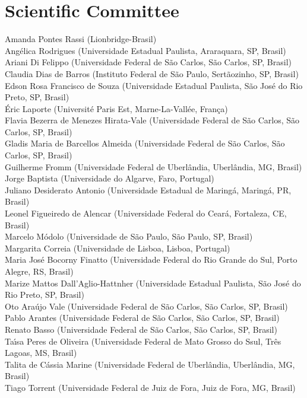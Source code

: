 \section*{Scientific Committee}
Amanda Pontes Rassi (Lionbridge-Brasil)\\
Ang\'elica Rodrigues (Universidade Estadual Paulista, Araraquara, SP, Brasil)\\
Ariani Di Felippo (Universidade Federal de S\~ao Carlos, S\~ao Carlos, SP, Brasil)\\
Claudia Dias de Barros (Instituto Federal de S\~ao Paulo,  Sert\~aozinho, SP, Brasil)\\
Edson Rosa Francisco de Souza (Universidade Estadual Paulista, S\~ao Jos\'e do Rio Preto, SP, Brasil)\\
\'Eric Laporte (Universit\'e Paris Est, Marne-La-Vall\'ee, Fran\c{c}a)\\
Flavia Bezerra de Menezes Hirata-Vale (Universidade Federal de S\~ao Carlos, S\~ao Carlos, SP, Brasil)\\
Gladis Maria de Barcellos Almeida (Universidade Federal de S\~ao Carlos, S\~ao Carlos, SP, Brasil)\\
Guilherme Fromm (Universidade Federal de Uberl\^andia, Uberl\^andia, MG, Brasil)\\
Jorge Baptista (Universidade do Algarve, Faro, Portugal)\\
Juliano Desiderato Antonio (Universidade Estadual de Maring\'a,  Maring\'a, PR, Brasil)\\
Leonel Figueiredo de Alencar (Universidade Federal do Cear\'a, Fortaleza, CE, Brasil)\\
Marcelo M\'odolo (Universidade de S\~ao Paulo, S\~ao Paulo, SP, Brasil)\\
Margarita Correia (Universidade de Lisboa, Lisboa, Portugal)\\
Maria Jos\'e Bocorny Finatto (Universidade Federal do Rio Grande do Sul, Porto Alegre, RS, Brasil)\\
Marize Mattos Dall'Aglio-Hattnher (Universidade Estadual Paulista, S\~ao Jos\'e do Rio Preto, SP, Brasil)\\
Oto Ara\'ujo Vale (Universidade Federal de S\~ao Carlos, S\~ao Carlos, SP, Brasil)\\
Pablo Arantes  (Universidade Federal de S\~ao Carlos, S\~ao Carlos, SP, Brasil)\\
Renato Basso  (Universidade Federal de S\~ao Carlos, S\~ao Carlos, SP, Brasil)\\
Ta\'{\i}sa Peres de Oliveira (Universidade Federal de Mato Grosso do Ssul, Tr\^es Lagoas, MS, Brasil)\\
Talita de C\'assia Marine (Universidade Federal de Uberl\^andia, Uberl\^andia,  MG, Brasil)\\
Tiago Torrent (Universidade Federal de Juiz de Fora, Juiz de Fora, MG, Brasil)

